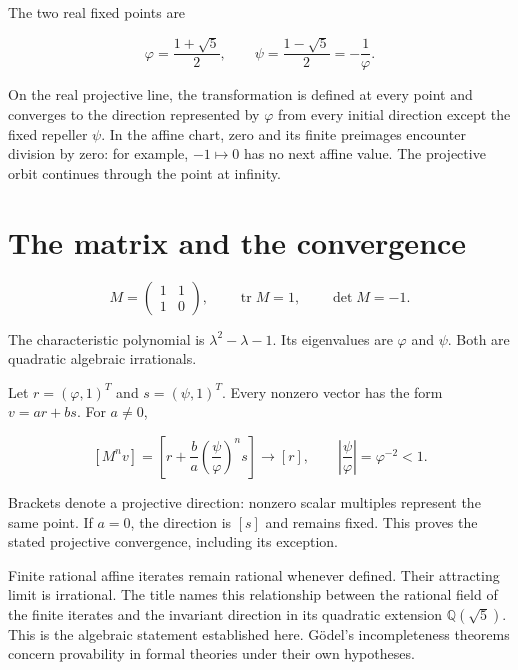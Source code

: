\documentclass[10pt,a4paper]{article}
\begin{document}
The two real fixed points are
\par

\[
\varphi=\frac{1+\sqrt5}{2},\qquad \psi=\frac{1-\sqrt5}{2}=-\frac1\varphi.
\]

On the real projective line, the transformation is defined at every point and converges to the direction represented by $\varphi$ from every initial direction except the fixed repeller $\psi$. In the affine chart, zero and its finite preimages encounter division by zero: for example, $-1\mapsto0$ has no next affine value. The projective orbit continues through the point at infinity.
\par

\section*{The matrix and the convergence}

\[
M=\begin{pmatrix}1&1\\1&0\end{pmatrix},\qquad \operatorname{tr}M=1,\qquad \det M=-1.
\]

The characteristic polynomial is $\lambda^2-\lambda-1$. Its eigenvalues are $\varphi$ and $\psi$. Both are quadratic algebraic irrationals.
\par

Let $r=(\varphi,1)^T$ and $s=(\psi,1)^T$. Every nonzero vector has the form $v=ar+bs$. For $a\ne0$,
\par

\[
[M^n v]=\left[r+\frac ba\left(\frac\psi\varphi\right)^n s\right]\longrightarrow[r],\qquad \left|\frac\psi\varphi\right|=\varphi^{-2}<1.
\]

Brackets denote a projective direction: nonzero scalar multiples represent the same point. If $a=0$, the direction is $[s]$ and remains fixed. This proves the stated projective convergence, including its exception.
\par

Finite rational affine iterates remain rational whenever defined. Their attracting limit is irrational. The title names this relationship between the rational field of the finite iterates and the invariant direction in its quadratic extension $\mathbb Q(\sqrt5)$. This is the algebraic statement established here. Gödel's incompleteness theorems concern provability in formal theories under their own hypotheses.
\par
\end{document}
